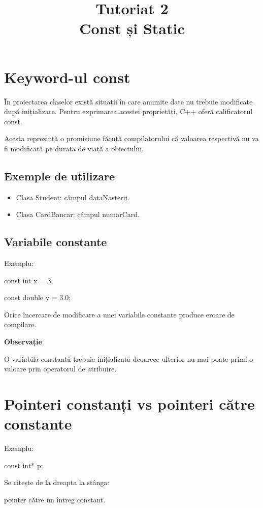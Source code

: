 \documentclass[12pt,a4paper]{article}
\title{Tutoriat 2\\Const și Static}
\author{}
\date{}
\begin{document}
\maketitle

\section{Keyword-ul const}

În proiectarea claselor există situații în care anumite date nu trebuie modificate după inițializare. Pentru exprimarea acestei proprietăți, C++ oferă calificatorul const.

Acesta reprezintă o promisiune făcută compilatorului că valoarea respectivă nu va fi modificată pe durata de viață a obiectului.

\subsection{Exemple de utilizare}

\begin{itemize}
\item Clasa Student: câmpul dataNasterii.
\item Clasa CardBancar: câmpul numarCard.
\end{itemize}

\subsection{Variabile constante}

Exemplu:

const int x = 3;

const double y = 3.0;

Orice încercare de modificare a unei variabile constante produce eroare de compilare.

\textbf{Observație}

O variabilă constantă trebuie inițializată deoarece ulterior nu mai poate primi o valoare prin operatorul de atribuire.

\section{Pointeri constanți vs pointeri către constante}

Exemplu:

const int* p;

Se citește de la dreapta la stânga:

pointer către un întreg constant.
\end{document}
